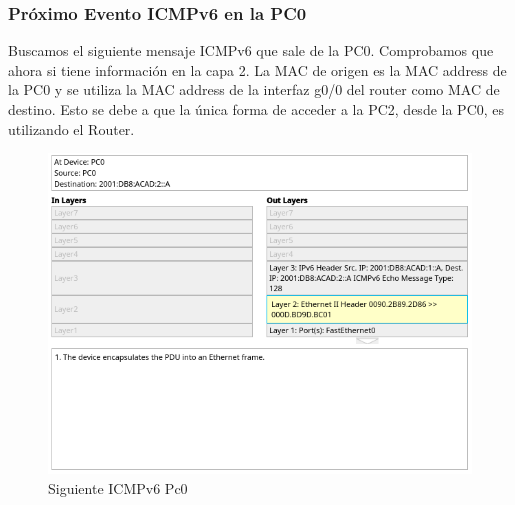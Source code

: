 \documentclass[a4paper,12pt]{article}
\begin{document}
\subsubsection{Próximo Evento ICMPv6 en la PC0}
Buscamos el siguiente mensaje ICMPv6 que sale de la PC0. Comprobamos que ahora si tiene información en la capa 2. La MAC de origen es la MAC address de la PC0 y se utiliza la MAC address de la interfaz g0/0 del router como MAC de destino. Esto se debe a que la única forma de acceder a la PC2, desde la PC0, es utilizando el Router.\\
\begin{figure}[h]
    \centering
    \includegraphics[width=1\textwidth]{imagenes/3.png}
    \caption{Siguiente ICMPv6 Pc0}
\end{figure}\\
\FloatBarrier
\end{document}
